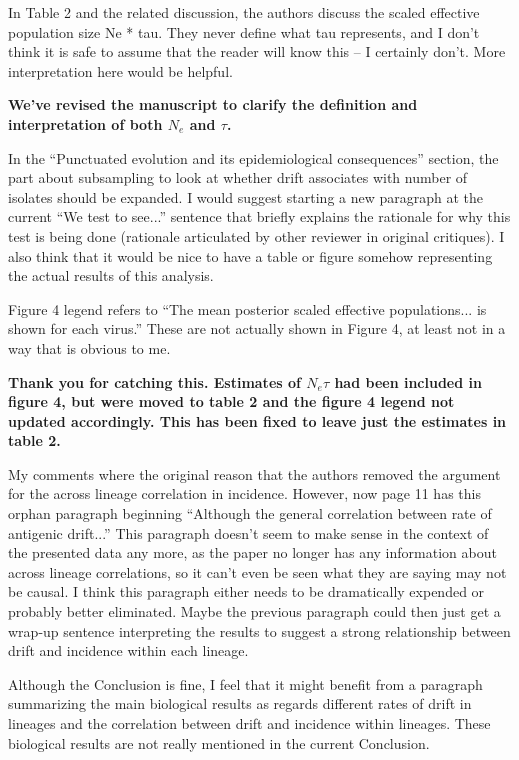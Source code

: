 \documentclass[11pt,oneside,letterpaper]{article}
\begin{document}
In Table 2 and the related discussion, the authors discuss the scaled effective population size Ne * tau. They never define what tau represents, and I don't think it is safe to assume that the reader will know this -- I certainly don't. More interpretation here would be helpful. 

\textbf{We've revised the manuscript to clarify the definition and interpretation of both $N_e$ and $\tau$.}

In the ``Punctuated evolution and its epidemiological consequences'' section, the part about subsampling to look at whether drift associates with number of isolates should be expanded. I would suggest starting a new paragraph at the current ``We test to see...'' sentence that briefly explains the rationale for why this test is being done (rationale articulated by other reviewer in original critiques). I also think that it would be nice to have a table or figure somehow representing the actual results of this analysis. 

Figure 4 legend refers to ``The mean posterior scaled effective populations... is shown for each virus.'' These are not actually shown in Figure 4, at least not in a way that is obvious to me. 

\textbf{Thank you for catching this.  Estimates of $N_e\tau$ had been included in figure 4, but were moved to table 2 and the figure 4 legend not updated accordingly.  This has been fixed to leave just the estimates in table 2.}

My comments where the original reason that the authors removed the argument for the across lineage correlation in incidence. However, now page 11 has this orphan paragraph beginning ``Although the general correlation between rate of antigenic drift...'' This paragraph doesn't seem to make sense in the context of the presented data any more, as the paper no longer has any information about across lineage correlations, so it can't even be seen what they are saying may not be causal. I think this paragraph either needs to be dramatically expended or probably better eliminated. Maybe the previous paragraph could then just get a wrap-up sentence interpreting the results to suggest a strong relationship between drift and incidence within each lineage. 

Although the Conclusion is fine, I feel that it might benefit from a paragraph summarizing the main biological results as regards different rates of drift in lineages and the correlation between drift and incidence within lineages. These biological results are not really mentioned in the current Conclusion. 
\end{document}
